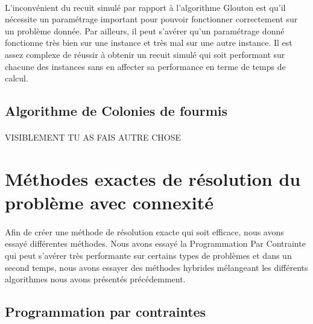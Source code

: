 \documentclass[a4paper, 11pt]{article} %
\begin{document}
\paragraph*{}
L'inconvénient du recuit simulé par rapport à l'algorithme Glouton est qu'il nécessite un paramétrage important pour pouvoir fonctionner correctement sur un problème donnée. Par ailleurs, il peut s'avérer qu'un paramétrage donné fonctionne très bien sur une instance et très mal sur une autre instance. Il est assez complexe de réussir à obtenir un recuit simulé qui soit performant sur chacune des instances sans en affecter sa performance en terme de temps de calcul.


\subsection{Algorithme de Colonies de fourmis}

\paragraph*{}
VISIBLEMENT TU AS FAIS AUTRE CHOSE

\section{Méthodes exactes de résolution du problème avec connexité}

\paragraph*{}
Afin de créer une méthode de résolution exacte qui soit efficace, nous avons essayé différentes méthodes. Nous avons essayé la Programmation Par Contrainte qui peut s'avérer très performante sur certains types de problèmes et dans un second temps, nous avons essayer des méthodes hybrides mélangeant les différents algorithmes nous avons présentés précédemment.

\subsection{Programmation par contraintes}
\end{document}
